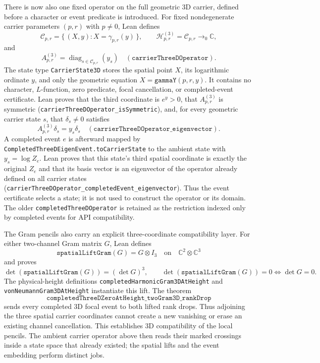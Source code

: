 \documentclass[11pt]{article}
\theoremstyle{definition}
\begin{document}
There is now also one fixed operator on the full geometric 3D carrier,
defined before a character or event predicate is introduced.  For fixed
nondegenerate carrier parameters $(p,r)$ with $p\ne0$, Lean defines
\[
 \mathcal C_{p,r}=\{\,(X,y):X=\gamma_{p,r}(y)\,\},\qquad
 \mathcal H^{(3)}_{p,r}=\mathcal C_{p,r}\to_0\mathbb C,
\]
and
\[
 A^{(3)}_{p,r}=\operatorname{diag}_{s\in\mathcal C_{p,r}}(y_s)
 \quad
 (\texttt{carrierThreeDOperator}).
\]
The state type \texttt{CarrierState3D} stores the spatial point $X$, its
logarithmic ordinate $y$, and only the geometric equation
$X=\texttt{gammaY}(p,r,y)$.  It contains no character, $L$-function, zero
predicate, focal cancellation, or completed-event certificate.  Lean proves
that the third coordinate is $e^y>0$, that \(A^{(3)}_{p,r}\) is symmetric
(\texttt{carrierThreeDOperator\_isSymmetric}), and, for every geometric
carrier state $s$, that \(\delta_s\ne0\) satisfies
\[
 A^{(3)}_{p,r}\delta_s=y_s\delta_s
 \quad
 (\texttt{carrierThreeDOperator\_eigenvector}).
\]
A completed event $e$ is afterward mapped by
\texttt{CompletedThreeDEigenEvent.toCarrierState} to the ambient state with
$y_s=\log Z_e$.  Lean proves that this state's third spatial coordinate is
exactly the original $Z_e$ and that its basis vector is an eigenvector of the
operator already defined on all carrier states
(\texttt{carrierThreeDOperator\_completedEvent\_eigenvector}).  Thus the
event certificate selects a state; it is not used to construct the operator
or its domain.  The older \texttt{completedThreeDOperator} is retained as the
restriction indexed only by completed events for API compatibility.

The Gram pencils also carry an explicit three-coordinate compatibility layer.
For either two-channel Gram matrix $G$, Lean defines
\[
 \texttt{spatialLiftGram}(G)=G\otimes I_3
 \quad\text{on}\quad \mathbb C^2\otimes\mathbb C^3
\]
and proves
\[
 \det(\texttt{spatialLiftGram}(G))=(\det G)^3,
 \qquad
 \det(\texttt{spatialLiftGram}(G))=0
 \Longleftrightarrow \det G=0.
\]
The physical-height definitions \texttt{completedHarmonicGram3DAtHeight} and
\texttt{vonNeumannGram3DAtHeight} instantiate this lift.  The theorem
\[
 \texttt{completedThreeDZeroAtHeight\_twoGram3D\_rankDrop}
\]
sends every completed 3D focal event to both lifted rank drops.  Thus adjoining the three spatial carrier coordinates
cannot create a new vanishing or erase an existing channel cancellation.  This
establishes 3D compatibility of the local pencils.  The ambient carrier
operator above then reads their marked crossings inside a state space that
already existed; the spatial lifts and the event embedding perform distinct
jobs.
\end{document}
